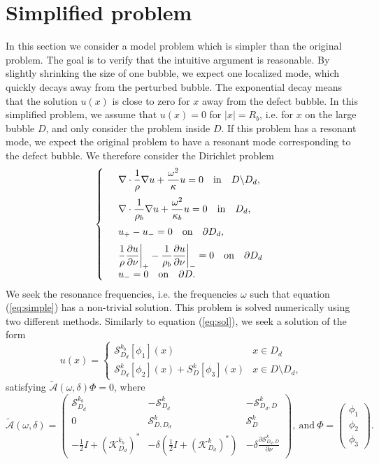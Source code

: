 \documentclass[a4paper]{article}
\theoremstyle{definition}
\newcommand{\A}{\mathcal{A}}
\renewcommand{\S}{\mathcal{S}}
\newcommand{\K}{\mathcal{K}}
\newcommand{\ds}{\displaystyle}
\newcommand{\eqnref}[1]{(\ref {#1})}
\def\nm{\noalign{\medskip}}
\begin{document}
\section{Simplified problem}
In this section we consider a model problem which is simpler than the original problem. The goal is to verify that the intuitive argument is reasonable. By slightly shrinking the size of one bubble, we expect one localized mode, which quickly decays away from the perturbed bubble. The exponential decay means that the solution $u(x)$ is close to zero for $x$ away from the defect bubble. In this simplified problem, we assume that $u(x)=0$ for $|x|=R_b$, i.e. for $x$ on the large bubble $D$, and only consider the problem inside $D$. If this problem has a resonant mode, we expect the original problem to have a resonant mode corresponding to the defect bubble. We therefore consider the Dirichlet problem
\begin{equation} \label{eq:simple}
\left\{
\begin{array} {ll}
&\ds \nabla \cdot \frac{1}{\rho} \nabla  u+ \frac{\omega^2}{\kappa} u  = 0 \quad \text{in} \quad D \backslash D_d, \\
\nm
&\ds \nabla \cdot \frac{1}{\rho_b} \nabla  u+ \frac{\omega^2}{\kappa_b} u  = 0 \quad \text{in} \quad D_d, \\
\nm
&\ds  u_{+} -u_{-}  =0   \quad \text{on} \quad \partial D_d, \\
\nm
& \ds  \frac{1}{\rho} \frac{\partial u}{\partial \nu} \bigg|_{+} - \frac{1}{\rho_b} \frac{\partial u}{\partial \nu} \bigg|_{-} =0 \quad \text{on} \quad \partial D_d \\
&\ds u_- = 0 \quad \text{on} \quad \partial D.
\end{array}
\right .
\end{equation}
We seek the resonance frequencies, i.e. the frequencies $\omega$ such that equation \eqnref{eq:simple} has a non-trivial solution. This problem is solved numerically using two different methods. Similarly to equation \eqnref{eq:sol}, we seek a solution of the form 
\begin{equation} \label{eq:simplesol}
u(x) = \begin{cases}
\S_{D_d}^{k_b}[\phi_1](x) \quad &x\in D_d \\
\S_{D_d}^{k}[\phi_2](x) + S_D^k[\phi_3](x) & x\in D\setminus D_d,
\end{cases}
\end{equation}
satisfying $\tilde{\A}(\omega, \delta)\Phi = 0$, where
\begin{equation} \label{eq:simpleA}
\tilde{\A}(\omega, \delta) = 
\begin{pmatrix}
\S_{D_d}^{k_b} &  -\S_{D_d}^{k} & -\S_{D_d,D}^{k} \\
0 & \S_{D,D_d}^k & \S_{D}^k \\
-\frac{1}{2}I+ (\K_{D_d}^{k_b})^*& -\delta\left( \frac{1}{2}I+ \left(\K_{D_d}^{k}\right)^*\right) & -\delta \frac{\partial \S_{D_d,D}^{k}}{\partial \nu}
\end{pmatrix}, 
\ \text{and}  \ \Phi= 
\begin{pmatrix}
\phi_1\\
\phi_2 \\
\phi_3
\end{pmatrix}.
\end{equation}
\end{document}
